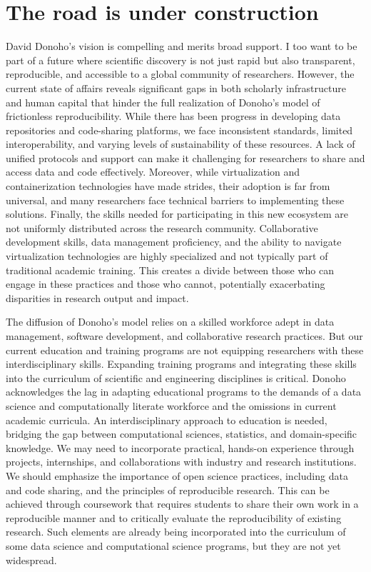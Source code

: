 \documentclass[]{hdsr}
\begin{document}
\section*{The road is under construction}

David Donoho's vision is compelling and merits broad support. I too want to be part of a future where scientific discovery is not just rapid but also transparent, reproducible, and accessible to a global community of researchers. However, the current state of affairs reveals significant gaps in both scholarly infrastructure and human capital that hinder the full realization of Donoho's model of frictionless reproducibility. While there has been progress in developing data repositories and code-sharing platforms, we face inconsistent standards, limited interoperability, and varying levels of sustainability of these resources. A lack of unified protocols and support can make it challenging for researchers to share and access data and code effectively. Moreover, while virtualization and containerization technologies have made strides, their adoption is far from universal, and many researchers face technical barriers to implementing these solutions. Finally, the skills needed for participating in this new ecosystem are not uniformly distributed across the research community. Collaborative development skills, data management proficiency, and the ability to navigate virtualization technologies are highly specialized and not typically part of traditional academic training. This creates a divide between those who can engage in these practices and those who cannot, potentially exacerbating disparities in research output and impact.

The diffusion of Donoho's model relies on a skilled workforce adept in data management, software development, and collaborative research practices. But our current education and training programs are not equipping researchers with these interdisciplinary skills. Expanding training programs and integrating these skills into the curriculum of scientific and engineering disciplines is critical.
Donoho acknowledges the lag in adapting educational programs to the demands of a data science and computationally literate workforce and the omissions in current academic curricula. An interdisciplinary approach to education is needed, bridging the gap between computational sciences, statistics, and domain-specific knowledge. We may need to incorporate practical, hands-on experience through projects, internships, and collaborations with industry and research institutions. We should emphasize the importance of open science practices, including data and code sharing, and the principles of reproducible research. This can be achieved through coursework that requires students to share their own work in a reproducible manner and to critically evaluate the reproducibility of existing research. Such elements are already being incorporated into the curriculum of some data science and computational science programs, but they are not yet widespread.
\end{document}
